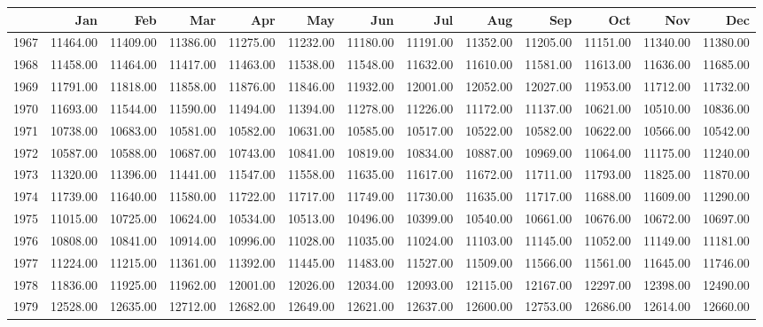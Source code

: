 \begin{longtable}{rrrrrrrrrrrrr}
  \hline
 & Jan & Feb & Mar & Apr & May & Jun & Jul & Aug & Sep & Oct & Nov & Dec \\ 
  \hline
1967 & 11464.00 & 11409.00 & 11386.00 & 11275.00 & 11232.00 & 11180.00 & 11191.00 & 11352.00 & 11205.00 & 11151.00 & 11340.00 & 11380.00 \\ 
  1968 & 11458.00 & 11464.00 & 11417.00 & 11463.00 & 11538.00 & 11548.00 & 11632.00 & 11610.00 & 11581.00 & 11613.00 & 11636.00 & 11685.00 \\ 
  1969 & 11791.00 & 11818.00 & 11858.00 & 11876.00 & 11846.00 & 11932.00 & 12001.00 & 12052.00 & 12027.00 & 11953.00 & 11712.00 & 11732.00 \\ 
  1970 & 11693.00 & 11544.00 & 11590.00 & 11494.00 & 11394.00 & 11278.00 & 11226.00 & 11172.00 & 11137.00 & 10621.00 & 10510.00 & 10836.00 \\ 
  1971 & 10738.00 & 10683.00 & 10581.00 & 10582.00 & 10631.00 & 10585.00 & 10517.00 & 10522.00 & 10582.00 & 10622.00 & 10566.00 & 10542.00 \\ 
  1972 & 10587.00 & 10588.00 & 10687.00 & 10743.00 & 10841.00 & 10819.00 & 10834.00 & 10887.00 & 10969.00 & 11064.00 & 11175.00 & 11240.00 \\ 
  1973 & 11320.00 & 11396.00 & 11441.00 & 11547.00 & 11558.00 & 11635.00 & 11617.00 & 11672.00 & 11711.00 & 11793.00 & 11825.00 & 11870.00 \\ 
  1974 & 11739.00 & 11640.00 & 11580.00 & 11722.00 & 11717.00 & 11749.00 & 11730.00 & 11635.00 & 11717.00 & 11688.00 & 11609.00 & 11290.00 \\ 
  1975 & 11015.00 & 10725.00 & 10624.00 & 10534.00 & 10513.00 & 10496.00 & 10399.00 & 10540.00 & 10661.00 & 10676.00 & 10672.00 & 10697.00 \\ 
  1976 & 10808.00 & 10841.00 & 10914.00 & 10996.00 & 11028.00 & 11035.00 & 11024.00 & 11103.00 & 11145.00 & 11052.00 & 11149.00 & 11181.00 \\ 
  1977 & 11224.00 & 11215.00 & 11361.00 & 11392.00 & 11445.00 & 11483.00 & 11527.00 & 11509.00 & 11566.00 & 11561.00 & 11645.00 & 11746.00 \\ 
  1978 & 11836.00 & 11925.00 & 11962.00 & 12001.00 & 12026.00 & 12034.00 & 12093.00 & 12115.00 & 12167.00 & 12297.00 & 12398.00 & 12490.00 \\ 
  1979 & 12528.00 & 12635.00 & 12712.00 & 12682.00 & 12649.00 & 12621.00 & 12637.00 & 12600.00 & 12753.00 & 12686.00 & 12614.00 & 12660.00 \\ 

\end{longtable}
